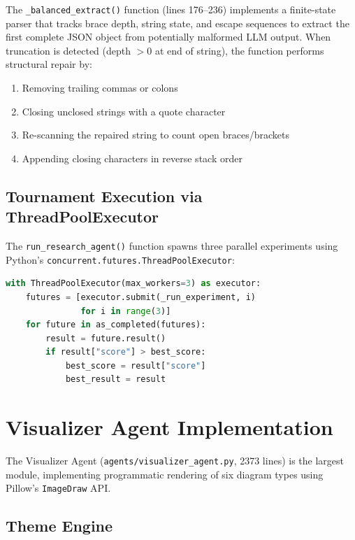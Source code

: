 The \texttt{\_balanced\_extract()} function (lines 176--236) implements a finite-state parser that tracks brace depth, string state, and escape sequences to extract the first complete JSON object from potentially malformed LLM output. When truncation is detected (depth $> 0$ at end of string), the function performs structural repair by:
\begin{enumerate}[label=\arabic*., leftmargin=2cm]
\item Removing trailing commas or colons
\item Closing unclosed strings with a quote character
\item Re-scanning the repaired string to count open braces/brackets
\item Appending closing characters in reverse stack order
\end{enumerate}

\subsection{Tournament Execution via ThreadPoolExecutor}

The \texttt{run\_research\_agent()} function spawns three parallel experiments using Python's \texttt{concurrent.futures.ThreadPoolExecutor}:

\begin{lstlisting}[language=Python, caption={Parallel Tournament Execution}, label={lst:tournament}]
with ThreadPoolExecutor(max_workers=3) as executor:
    futures = [executor.submit(_run_experiment, i)
               for i in range(3)]
    for future in as_completed(futures):
        result = future.result()
        if result["score"] > best_score:
            best_score = result["score"]
            best_result = result
\end{lstlisting}

\section{Visualizer Agent Implementation}

The Visualizer Agent (\texttt{agents/visualizer\_agent.py}, 2373 lines) is the largest module, implementing programmatic rendering of six diagram types using Pillow's \texttt{ImageDraw} API.

\subsection{Theme Engine}

